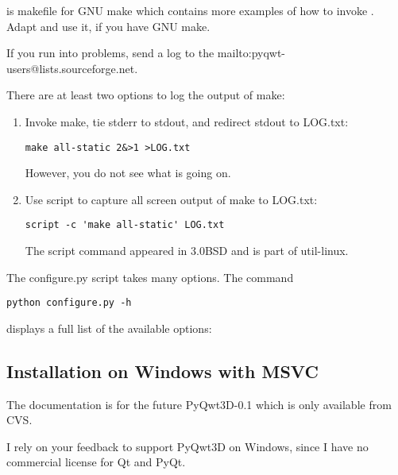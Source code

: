 \documentclass{manual}
\makeatletter
\newcommand{\mailinglist}{\ulink{mailing list}
  {mailto:pyqwt-users@lists.sourceforge.net}}
\newcommand{\Future}{
  \begin{notice}[warning]
    The documentation is for the future PyQwt3D-0.1 which is only available
    from CVS.
  \end{notice}
}
\makeatother
\begin{document}
\begin{notice}[note]
   is makefile for GNU make which contains more
  examples of how to invoke .
  Adapt and use it, if you have GNU make.
\end{notice}

\begin{notice}[note]
  If you run into problems, send a log to the \mailinglist{}.

  There are at least two options to log the output of make:
  \begin{enumerate}
  \item Invoke make, tie stderr to stdout, and redirect stdout to LOG.txt:
\begin{verbatim}
make all-static 2&>1 >LOG.txt
\end{verbatim}
    However, you do not see what is going on.
  \item Use script to capture all screen output of make to LOG.txt:
\begin{verbatim}
script -c 'make all-static' LOG.txt
\end{verbatim}
    The script command appeared in 3.0BSD and is part of util-linux.
  \end{enumerate}
\end{notice}

\begin{notice}[note]
  The configure.py script takes many options. The command
\begin{verbatim}
python configure.py -h
\end{verbatim}
  displays a full list of the available options:
  
\end{notice}


\subsection{Installation on Windows with MSVC\label{win-install}}

\Future{}

\begin{notice}[note]
  I rely on your feedback to support PyQwt3D on Windows, since I have no
  commercial license for Qt and PyQt.
\end{notice}
\end{document}
